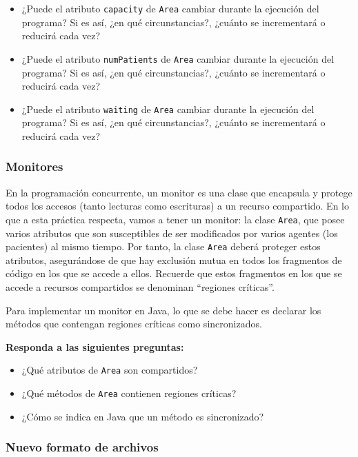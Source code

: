 \documentclass[10pt,a4paper,spanish]{article}
\newcommand{\code}[1]{\texttt{#1}}
\begin{document}
\begin{itemize}
    \item ¿Puede el atributo \code{capacity} de \code{Area} cambiar durante la ejecución del programa? Si es así, ¿en qué circunstancias?, ¿cuánto se incrementará o reducirá cada vez?
    \item ¿Puede el atributo \code{numPatients} de \code{Area} cambiar durante la ejecución del programa? Si es así, ¿en qué circunstancias?, ¿cuánto se incrementará o reducirá cada vez?
    \item ¿Puede el atributo \code{waiting} de \code{Area} cambiar durante la ejecución del programa? Si es así, ¿en qué circunstancias?, ¿cuánto se incrementará o reducirá cada vez?
\end{itemize}

\subsubsection{Monitores}

En la programación concurrente, un monitor es una clase que encapsula y protege todos los accesos (tanto lecturas como escrituras) a un recurso compartido. En lo que a esta práctica respecta, vamos a tener un monitor: la clase \code{Area}, que posee varios atributos que son susceptibles de ser modificados por varios agentes (los pacientes) al mismo tiempo. Por tanto, la clase \code{Area} deberá proteger estos atributos, asegurándose de que hay exclusión mutua en todos los fragmentos de código en los que se accede a ellos. Recuerde que estos fragmentos en los que se accede a recursos compartidos se denominan ``regiones críticas''.

Para implementar un monitor en Java, lo que se debe hacer es declarar los métodos que contengan regiones críticas como sincronizados.

\textbf{Responda a las siguientes preguntas:}

\begin{itemize}
    \item ¿Qué atributos de \code{Area} son compartidos?
    \item ¿Qué métodos de \code{Area} contienen regiones críticas?
    \item ¿Cómo se indica en Java que un método es sincronizado?
\end{itemize}

\subsubsection{Nuevo formato de archivos}
\label{sec:archivo}
\end{document}
